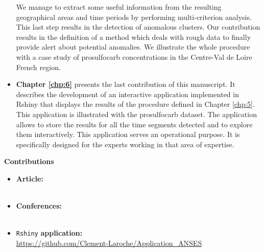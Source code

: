 \begin{itemize}
We manage to extract some useful information from the resulting geographical areas and time periods by performing multi-criterion analysis. This last step results in the detection of anomalous clusters. Our contribution results in the definition of a method which deals with rough data to finally provide alert about potential anomalies. We illustrate the whole procedure with a case study of prosulfocarb concentrations in the Centre-Val de Loire French region.
\item{\textbf{Chapter \ref{chp:6}}} presents the last contribution of this manuscript. It describes the development of an interactive application implemented in Rshiny that displays the results of the procedure defined in Chapter \ref{chp:5}. This application is illustrated with the prosulfocarb dataset. The application allows to store the results for all the time segments detected and to explore them interactively. This application serves an operational purpose. It is specifically designed for the experts working in that area of expertise.
\end{itemize}

{\Large\textbf{Contributions}}
\begin{itemize}
\item \textbf{Article:} \\ 
 \\
\item \textbf{Conferences:} \\
 \\
\item \texttt{Rshiny} \textbf{application:} \\
\url{https://github.com/Clement-Laroche/Application_ANSES}
\end{itemize}

